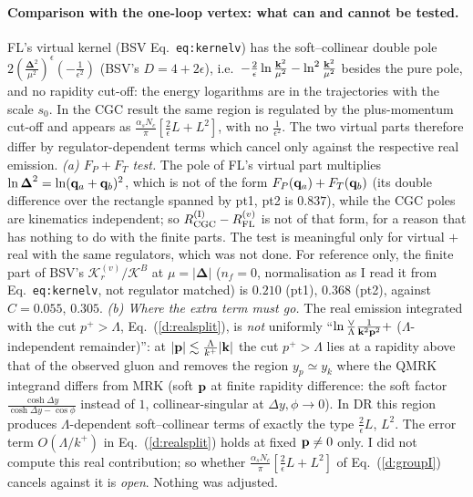 \paragraph{Comparison with the one-loop vertex: what can and cannot be tested.} FL's virtual kernel (BSV Eq.~\texttt{eq:kernelv}) has the soft--collinear double pole $2(\frac{\boldsymbol\Delta^2}{\mu^2})^\epsilon(-\frac{1}{\epsilon^2})$ (BSV's $D=4+2\epsilon$), i.e.\ $-\frac{2}{\epsilon}\ln\frac{\mathbf{k}^2}{\mu^2}-\ln^2\frac{\mathbf{k}^2}{\mu^2}$ besides the pure pole, and no rapidity cut-off: the energy logarithms are in the trajectories with the scale $s_0$. In the CGC result the same region is regulated by the plus-momentum cut-off and appears as $\frac{\alpha_sN_c}{\pi}[\frac2\epsilon L+L^2]$, with no $\frac{1}{\epsilon^2}$. The two virtual parts therefore differ by regulator-dependent terms which cancel only against the respective real emission. \emph{(a) $F_P+F_T$ test.} The pole of FL's virtual part multiplies $\ln\boldsymbol\Delta^2=\ln(\mathbf{q}_a+\mathbf{q}_b)^2$, which is not of the form $F_P(\mathbf{q}_a)+F_T(\mathbf{q}_b)$ (its double difference over the rectangle spanned by pt1, pt2 is $0.837$), while the CGC poles are kinematics independent; so $R^{\rm (I)}_{\rm CGC}-R^{(v)}_{\rm FL}$ is not of that form, for a reason that has nothing to do with the finite parts. The test is meaningful only for virtual $+$ real with the same regulators, which was not done. For reference only, the finite part of BSV's $\mathcal K^{(v)}_r/\mathcal K^B$ at $\mu=|\boldsymbol\Delta|$ ($n_f=0$, normalisation as I read it from Eq.~\texttt{eq:kernelv}, not regulator matched) is $0.210$ (pt1), $0.368$ (pt2), against $C=0.055$, $0.305$. \emph{(b) Where the extra term must go.} The real emission integrated with the cut $p^+>\Lambda$, Eq.~(\ref{d:realsplit}), is \emph{not} uniformly ``$\ln\frac\vee\Lambda\frac{1}{\mathbf{k}^2\mathbf{p}^2}+$ ($\Lambda$-independent remainder)'': at $|\mathbf{p}|\lesssim\frac{\Lambda}{k^+}|\mathbf{k}|$ the cut $p^+>\Lambda$ lies at a rapidity above that of the observed gluon and removes the region $y_p\simeq y_k$ where the QMRK integrand differs from MRK (soft $\mathbf{p}$ at finite rapidity difference: the soft factor $\frac{\cosh\Delta y}{\cosh\Delta y-\cos\phi}$ instead of $1$, collinear-singular at $\Delta y,\phi\to0$). In DR this region produces $\Lambda$-dependent soft--collinear terms of exactly the type $\frac2\epsilon L$, $L^2$. The error term $O(\Lambda/k^+)$ in Eq.~(\ref{d:realsplit}) holds at fixed $\mathbf{p}\neq0$ only. I did not compute this real contribution; so whether $\frac{\alpha_sN_c}{\pi}[\frac2\epsilon L+L^2]$ of Eq.~(\ref{d:groupI}) cancels against it is \emph{open}. Nothing was adjusted.

